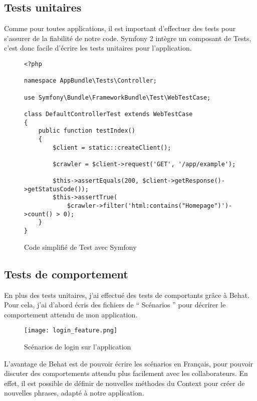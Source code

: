 \subsection{Tests unitaires}

Comme pour toutes applications, il est important d'effectuer des tests pour s'assurer de la fiabilité de notre code. Symfony 2 intègre un composant de Tests, c'est donc facile d'écrire les tests unitaires pour l'application.

\begin{figure}[h]
\begin{lstlisting}[frame=single]
<?php

namespace AppBundle\Tests\Controller;

use Symfony\Bundle\FrameworkBundle\Test\WebTestCase;

class DefaultControllerTest extends WebTestCase
{
    public function testIndex()
    {
        $client = static::createClient();

        $crawler = $client->request('GET', '/app/example');

        $this->assertEquals(200, $client->getResponse()->getStatusCode());
        $this->assertTrue(
            $crawler->filter('html:contains("Homepage")')->count() > 0);
    }
}

\end{lstlisting}
\caption{Code simplifié de Test avec Symfony}
\end{figure}

\newpage

\subsection{Tests de comportement}

En plus des tests unitaires, j'ai effectué des tests de comportants grâce à Behat. Pour cela, j'ai d'abord écris des fichiers de `` Scénarios '' pour décrirer le comportement attendu de mon application.

\begin{figure}[h]
\begin{center}
\texttt{[image: login\_feature.png]}
\end{center}
\caption{Scénarios de login sur l'application}
\end{figure}

L'avantage de Behat est de pouvoir écrire les scénarios en Français, pour pouvoir discuter des comportements attendu plus facilement avec les collaborateurs. En effet, il est possible de définir de nouvelles méthodes du Context pour créer de nouvelles phrases, adapté à notre application.